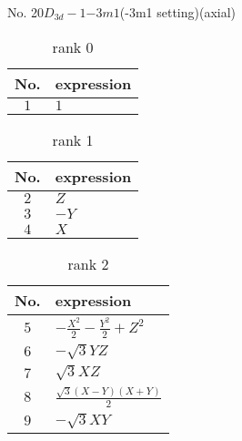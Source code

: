 \documentclass[fleqn,8pt,landscape]{jsarticle}
\begin{document}
\setcounter{MaxMatrixCols}{16}

\begin{center}
\LARGE
No. 20\quad$D_{3d}-1$\quad$-3m1$\quad(-3m1 setting)\quad[ trigonal ] (axial)
\end{center}
\begin{table}[ht!]
\begin{center}
\caption{rank 0}
\renewcommand{\arraystretch}{1.3}
\begin{tabular}{cl} \hline \hline
No. & expression \\ \hline
$ 1 $ & $ 1 $ \\
 \hline \hline
\end{tabular}
\end{center}
\end{table}
\begin{table}[ht!]
\begin{center}
\caption{rank 1}
\renewcommand{\arraystretch}{1.3}
\begin{tabular}{cl} \hline \hline
No. & expression \\ \hline
$ 2 $ & $ Z $ \\
$ 3 $ & $ - Y $ \\
$ 4 $ & $ X $ \\
 \hline \hline
\end{tabular}
\end{center}
\end{table}
\begin{table}[ht!]
\begin{center}
\caption{rank 2}
\renewcommand{\arraystretch}{1.3}
\begin{tabular}{cl} \hline \hline
No. & expression \\ \hline
$ 5 $ & $ - \frac{X^{2}}{2} - \frac{Y^{2}}{2} + Z^{2} $ \\
$ 6 $ & $ - \sqrt{3} Y Z $ \\
$ 7 $ & $ \sqrt{3} X Z $ \\
$ 8 $ & $ \frac{\sqrt{3} \left(X - Y\right) \left(X + Y\right)}{2} $ \\
$ 9 $ & $ - \sqrt{3} X Y $ \\
 \hline \hline
\end{tabular}
\end{center}
\end{table}
\end{document}
